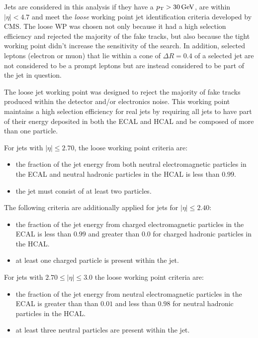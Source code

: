 Jets are considered in this analysis if they have a $p_{\mathrm{T}} > 30\,\text{Ge\hspace{-.08em}V}$, are within $|\eta| < 4.7$ and meet the \emph{loose} working point jet identification criteria developed by CMS.
The loose WP was chosen not only because it had a high selection efficiency and rejected the majority of the fake tracks, but also because the tight working point didn't increase the sensitivity of the search.
In addition, selected leptons (electron or muon) that lie within a cone of $\Delta R = 0.4$ of a selected jet are not considered to be a prompt leptons but are instead considered to be part of the jet in question.

The loose jet working point was designed to reject the majority of fake tracks produced within the detector and/or electronics noise. 
This working point maintains a high selection efficiency for real jets by requiring all jets to have part of their energy deposited in both the ECAL and HCAL and be composed of more than one particle.

For jets with $|\eta| \leq 2.70$, the loose working point criteria are:
\begin{itemize}
\item the fraction of the jet energy from both neutral electromagnetic particles in the ECAL and neutral hadronic particles in the HCAL is less than $0.99$.
\item the jet must consist of at least two particles.
\end{itemize}

The following criteria are additionally applied for jets for $|\eta| \leq 2.40$:
\begin{itemize}
\item the fraction of the jet energy from charged electromagnetic particles in the ECAL is less than $0.99$ and greater than 0.0 for charged hadronic particles in the HCAL.
\item at least one charged particle is present within the jet.
\end{itemize}

For jets with $ 2.70 \leq |\eta| \leq 3.0$ the loose working point criteria are:
\begin{itemize}
\item the fraction of the jet energy from neutral electromagnetic particles in the ECAL is greater than than $0.01$ and less than $0.98$ for neutral hadronic particles in the HCAL.
\item at least three neutral particles are present within the jet.
\end{itemize}

